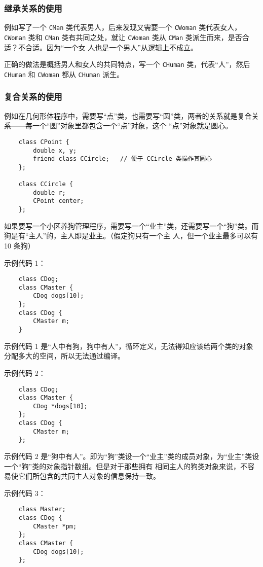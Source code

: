 \documentclass[UTF8]{ctexart}
\begin{document}
\subsubsection{继承关系的使用}
例如写了一个 \texttt{CMan} 类代表男人，后来发现又需要一个 \texttt{CWoman} 类代表女人，\texttt{CWoman} 类和
\texttt{CMan} 类有共同之处，就让 \texttt{CWoman} 类从 \texttt{CMan} 类派生而来，是否合适？不合适。因为“一个女
人也是一个男人”从逻辑上不成立。

正确的做法是概括男人和女人的共同特点，写一个 \texttt{CHuman} 类，代表“人”，然后 \texttt{CHuman} 和
\texttt{CWoman} 都从 \texttt{CHuman} 派生。

\subsubsection{复合关系的使用}
例如在几何形体程序中，需要写“点”类，也需要写“圆”类，两者的关系就是复合关系——每一个“圆”对象里都包含一个“点”对象，这个
“点”对象就是圆心。

\begin{verbatim}
    class CPoint {
        double x, y;
        friend class CCircle;   // 便于 CCircle 类操作其圆心
    };

    class CCircle {
        double r;
        CPoint center;
    };
\end{verbatim}

如果要写一个小区养狗管理程序，需要写一个“业主”类，还需要写一个“狗”类。而狗是有“主人”的，主人即是业主。（假定狗只有一个主
人，但一个业主最多可以有 10 条狗）

示例代码 1：
\begin{verbatim}
    class CDog;
    class CMaster {
        CDog dogs[10];
    };
    class CDog {
        CMaster m;
    }
\end{verbatim}

示例代码 1 是“人中有狗，狗中有人”，循环定义，无法得知应该给两个类的对象分配多大的空间，所以无法通过编译。

示例代码 2：
\begin{verbatim}
    class CDog;
    class CMaster {
        CDog *dogs[10];
    };
    class CDog {
        CMaster m;
    };
\end{verbatim}

示例代码 2 是“狗中有人”。即为“狗”类设一个“业主”类的成员对象，为“业主”类设一个“狗”类的对象指针数组。但是对于那些拥有
相同主人的狗类对象来说，不容易使它们所包含的共同主人对象的信息保持一致。

示例代码 3：
\begin{verbatim}
    class Master;
    class CDog {
        CMaster *pm;
    };
    class CMaster {
        CDog dogs[10];
    };
\end{verbatim}
\end{document}
